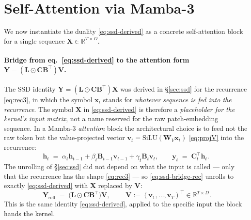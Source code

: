 \documentclass[11pt,a4paper]{article}
\begin{document}
\section{Self-Attention via Mamba-3}
\label{sec:self}

We now instantiate the duality \eqref{eq:ssd-derived} as a concrete
self-attention block for a single sequence
$\bm{X}\in\mathbb{R}^{T\times D}$.

\paragraph{Bridge from eq.~\eqref{eq:ssd-derived} to the attention form $\bm{Y} = (\bm{L}\odot\bm{C}\bm{B}^\top)\bm{V}$.}
The SSD identity $\bm{Y} = (\bm{L}\odot\bm{C}\bm{B}^\top)\bm{X}$ was
derived in \S\ref{sec:ssd} for the recurrence
\eqref{eq:rec3}, in which the symbol $\bm{x}_t$ stands for
\emph{whatever sequence is fed into the recurrence}. The symbol
$\bm{X}$ in \eqref{eq:ssd-derived} is therefore a \emph{placeholder
for the kernel's input matrix}, not a name reserved for the raw
patch-embedding sequence. In a Mamba-3 \emph{attention} block the
architectural choice is to feed not the raw token but the
value-projected vector $\bm{v}_t = \mathrm{SiLU}(\bm{W}_V\bm{x}_t)$
\eqref{eq:projV} into the recurrence:
\begin{equation}\label{eq:ssd-bridge-rec}
  \bm{h}_t \;=\; \alpha_t\bm{h}_{t-1} + \beta_t\bm{B}_{t-1}\bm{v}_{t-1}
                                       + \gamma_t\bm{B}_t\bm{v}_t,
  \qquad
  \bm{y}_t \;=\; \bm{C}_t^\top\bm{h}_t.
\end{equation}
The unrolling of \S\ref{sec:ssd} did not depend on what the input is
called — only that the recurrence has the shape \eqref{eq:rec3} — so
\eqref{eq:ssd-bridge-rec} unrolls to exactly \eqref{eq:ssd-derived}
with $\bm{X}$ replaced by $\bm{V}$:
\begin{equation}\label{eq:self-bridge}
  \boxed{\;\bm{Y}_{\text{self}} \;=\; \bigl(\bm{L}\odot\bm{C}\bm{B}^\top\bigr)\bm{V},\;}
  \qquad
  \bm{V} := (\bm{v}_1,\dots,\bm{v}_T)^\top\in\mathbb{R}^{T\times D}.
\end{equation}
This is the same identity \eqref{eq:ssd-derived}, applied to the
specific input the block hands the kernel.
\end{document}
